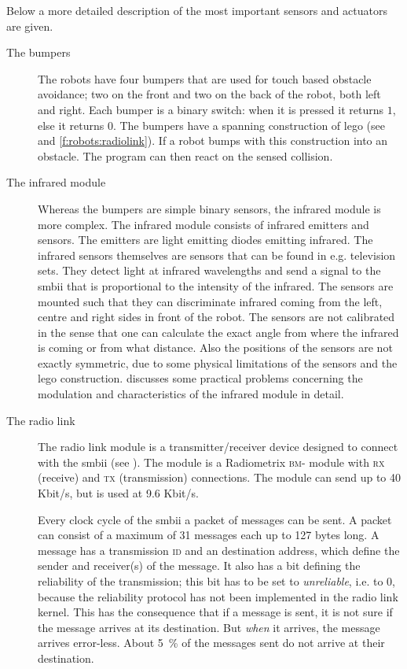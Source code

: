 Below a more detailed description of the most important sensors and actuators are given. 


\begin{description}
\item[The bumpers] The robots have four bumpers that are used for touch based obstacle avoidance; two on the front and two on the back of the robot, both left and right. Each bumper is a binary switch: when it is pressed it returns $1$, else it returns $0$. The bumpers have a spanning construction of {\sc lego} (see  and \ref{f:robots:radiolink}). If a robot bumps with this construction into an obstacle. The program can then react on the sensed collision.
\item[The infrared module] Whereas the bumpers are simple binary sensors, the infrared module  is more complex. The infrared module consists of infrared emitters and sensors. The emitters are light emitting diodes emitting infrared. The infrared sensors themselves are sensors that can be found in e.g. television sets. They detect light at infrared wavelengths and send a signal to the {\sc smbii} that is proportional to the intensity of the infrared. The sensors are mounted such that they can discriminate infrared coming from the left, centre and right sides in front of the robot. The sensors are not calibrated in the sense that one can calculate the exact angle from where the infrared is coming or from what distance. Also the  positions of the sensors are not exactly symmetric, due to some physical limitations of the sensors and the {\sc lego} construction. \citet{vogt:1997} discusses some practical problems concerning the modulation and characteristics of the infrared module in detail.

\item[The radio link] The radio link module is a transmitter/receiver device designed to connect with the {\sc smbii} (see ). The module is a Radiometrix {\scshape bm}- module with {\scshape rx} (receive) and {\scshape tx} (transmission) connections. The module can send up to 40 Kbit/s, but is used at 9.6 Kbit/s. 

Every clock cycle of the {\sc smbii} a packet of messages can be sent. A packet can consist of a maximum of 31 messages each up to 127 bytes long. A message has a transmission {\scshape id} and an destination address, which define the sender and receiver(s) of the message.  It also has a bit defining the reliability of the transmission; this bit has to be set to {\it unreliable}, i.e. to $0$, because the reliability protocol has not been implemented in the radio link kernel. This has the consequence that if a message is sent, it is not sure if the message arrives at its destination. But {\em when} it arrives, the message arrives error-less. About 5~\% of the messages sent do not arrive at their destination.


\end{description}
